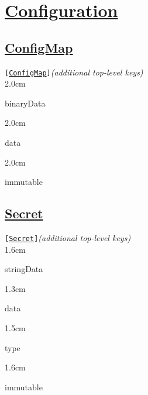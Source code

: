 \section{\href{https://kubernetes.io/docs/concepts/configuration/}{Configuration}}


\subsection*{\href{https://kubernetes.io/docs/concepts/configuration/configmap/}{ConfigMap}}
\texttt{[\href{https://kubernetes.io/docs/reference/kubernetes-api/config-and-storage-resources/config-map-v1/}{ConfigMap}]}\quad\textit{(additional top-level keys)}\\[-2mm]
\api
{2.0cm}{
binaryData  

}
{2.0cm}{
data        

}
{2.0cm}{
immutable   

}
\stopapi




\subsection*{\href{https://kubernetes.io/docs/concepts/configuration/secret/}{Secret}}

\texttt{[\href{https://kubernetes.io/docs/reference/kubernetes-api/config-and-storage-resources/secret-v1/}{Secret}]}\quad\textit{(additional top-level keys)}\\[-2mm]
\api
{1.6cm}{
stringData  

}
{1.3cm}{
data        

}
{1.5cm}{
type    

}
{1.6cm}{
immutable   

}
\stopapi






\begin{comment}

\texttt{Spec}\quad\textit{()}\\[-2mm]
\api
{2.0cm}{

}
{2.0cm}{

}
{2.0cm}{

}
\stopapi


\texttt{Status}\quad\textit{()}\\[-2mm]
\api
{2.0cm}{

}
{2.0cm}{

}
{2.0cm}{

}
\stopapi


\end{comment}

